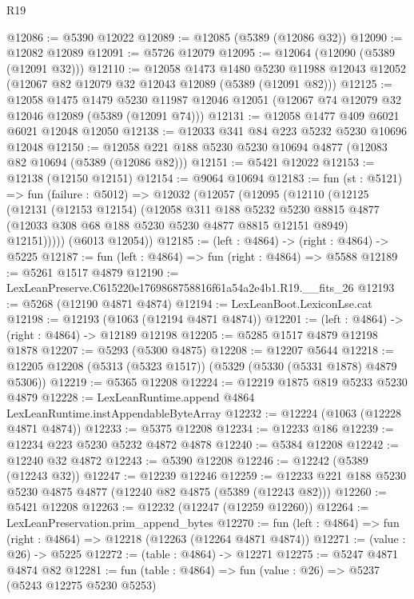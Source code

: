 \begin{lexlean}{R19}
\begin{coremodule}
@12086 := @5390 @12022
@12089 := @12085 (@5389 (@12086 @32))
@12090 := @12082 @12089
@12091 := @5726 @12079
@12095 := @12064 (@12090 (@5389 (@12091 @32)))
@12110 := @12058
    @1473
    @1480
    @5230
    @11988
    @12043
    @12052
    (@12067 @82 @12079 @32 @12043 @12089 (@5389 (@12091 @82)))
@12125 := @12058
    @1475
    @1479
    @5230
    @11987
    @12046
    @12051
    (@12067 @74 @12079 @32 @12046 @12089 (@5389 (@12091 @74)))
@12131 := @12058 @1477 @409 @6021 @6021 @12048 @12050
@12138 := @12033 @341 @84 @223 @5232 @5230 @10696 @12048
@12150 := @12058 @221 @188 @5230 @5230 @10694 @4877 (@12083 @82 @10694 (@5389 (@12086 @82)))
@12151 := @5421 @12022
@12153 := @12138 (@12150 @12151)
@12154 := @9064 @10694
@12183 := fun (st : @5121) =>
  fun (failure : @5012) =>
  @12032
    (@12057
      (@12095
        (@12110
          (@12125
            (@12131
              (@12153 @12154)
              (@12058
                @311
                @188
                @5232
                @5230
                @8815
                @4877
                (@12033 @308 @68 @188 @5230 @5230 @4877 @8815 @12151 @8949)
                @12151)))))
      (@6013 @12054))
@12185 := (left : @4864) -> (right : @4864) -> @5225
@12187 := fun (left : @4864) => fun (right : @4864) => @5588
@12189 := @5261 @1517 @4879
@12190 := LexLeanPreserve.C615220e1769868758816f61a54a2e4b1.R19.__fits_26
@12193 := @5268 (@12190 @4871 @4874)
@12194 := LexLeanBoot.LexiconLse.cat
@12198 := @12193 (@1063 (@12194 @4871 @4874))
@12201 := (left : @4864) -> (right : @4864) -> @12189 @12198
@12205 := @5285 @1517 @4879 @12198 @1878
@12207 := @5293 (@5300 @4875)
@12208 := @12207 @5644
@12218 := @12205 @12208 (@5313 (@5323 @1517)) (@5329 (@5330 (@5331 @1878) @4879 @5306))
@12219 := @5365 @12208
@12224 := @12219 @1875 @819 @5233 @5230 @4879
@12228 := LexLeanRuntime.append @4864 LexLeanRuntime.instAppendableByteArray
@12232 := @12224 (@1063 (@12228 @4871 @4874))
@12233 := @5375 @12208
@12234 := @12233 @186
@12239 := @12234 @223 @5230 @5232 @4872 @4878
@12240 := @5384 @12208
@12242 := @12240 @32 @4872
@12243 := @5390 @12208
@12246 := @12242 (@5389 (@12243 @32))
@12247 := @12239 @12246
@12259 := @12233 @221 @188 @5230 @5230 @4875 @4877 (@12240 @82 @4875 (@5389 (@12243 @82)))
@12260 := @5421 @12208
@12263 := @12232 (@12247 (@12259 @12260))
@12264 := LexLeanPreservation.prim_append_bytes
@12270 := fun (left : @4864) => fun (right : @4864) => @12218 (@12263 (@12264 @4871 @4874))
@12271 := (value : @26) -> @5225
@12272 := (table : @4864) -> @12271
@12275 := @5247 @4871 @4874 @82
@12281 := fun (table : @4864) => fun (value : @26) => @5237 (@5243 @12275 @5230 @5253)

\end{coremodule}
\end{lexlean}

